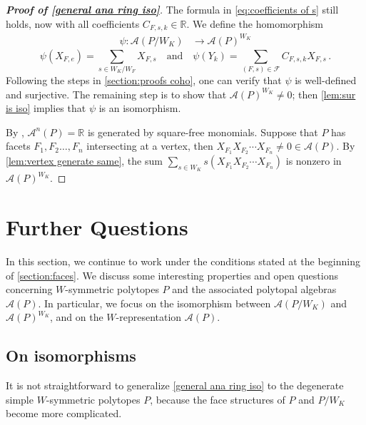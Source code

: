 \documentclass{amsart}
\theoremstyle{plain} \numberwithin{equation}{section}
\theoremstyle{definition}
\newcommand{\R}{\mathbb{R}}
\begin{document}
\begin{proof}[\textbf{Proof of \cref{general ana ring iso}}]\label{pf:general ana iso}
The formula in \cref{eq:coefficients of s} still holds, now with all coefficients $C_{F,s,k}\in\R$.
We define the homomorphism
\begin{align}
    \psi:\mathcal{A}(P/W_K)&\to\mathcal{A}(P)^{W_K}\label{eq:general iso}
  \end{align}
  $$
   \psi(X_{F,e})=\sum_{s\in{W_K}/{W_F}}X_{F,s} \quad\text{and}\quad
  \psi(Y_{k})=\sum_{(F,s)\in\mathcal{F}} C_{F,s,k}X_{F,s}\,.
  $$
  Following the steps in \cref{section:proofs coho}, one can verify that
$\psi$ is well-defined and surjective.
The remaining step is to  show that $\mathcal{A}(P)^{W_K}\ne 0$; then \cref{lem:sur is iso} implies that $\psi$ is an isomorphism.
  
   By \cite[Lemma 10.7.1]{danilovGEOMETRYTORICVARIETIES1978}, $\mathcal{A}^n(P)=\R$ is generated by square-free monomials. 
   Suppose that $P$ has facets $F_1,F_2\ldots,F_n$  intersecting at a vertex, then $X_{F_1}X_{F_2}\cdots X_{F_n}\ne 0\in\mathcal{A}(P)$. 
   By \cref{lem:vertex generate same}, the sum $\sum_{s\in W_K}s(X_{F_1}X_{F_2}\cdots X_{F_n})$ is nonzero in $\mathcal{A}(P)^{W_K}$.
   \qedhere
\end{proof}





\section{Further Questions}\label{section:generalization}

In this section, we continue to work under the conditions stated at the beginning of \cref{section:faces}.
We discuss some interesting properties and open questions concerning $W$-symmetric polytopes $P$ and the associated polytopal algebras $\mathcal{A}(P)$.
In particular, we focus on the isomorphism between $\mathcal{A}(P/W_K)$ and $\mathcal{A}(P)^{W_K}$, and on the $W$-representation $\mathcal{A}(P)$.




\subsection{On isomorphisms}
It is not straightforward to generalize \cref{general ana ring iso} to the degenerate simple $W$-symmetric polytopes $P$, because the face structures of
 $P$ and $P/W_K$ become more complicated.
\end{document}
